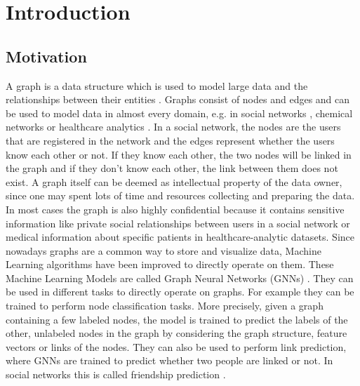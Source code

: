 \chapter{Introduction}


	\section{Motivation}

		A graph is a data structure which is used to model large data and the relationships between their entities \cite{DBLP:journals/corr/abs-2005-00687, cook2006mining}.
		Graphs consist of nodes and edges and can be used to model data in almost every domain, e.g. in social networks , chemical networks  or healthcare analytics .
		In a social network, the nodes are the users that are registered in the network and the edges represent whether the users know each other or not.
		If they know each other, the two nodes will be linked in the graph and if they don't know each other, the link between them does not exist.
		A graph itself can be deemed as intellectual property of the data owner, since one may spent lots of time and resources collecting and preparing the data.
		In most cases the graph is also highly confidential because it contains sensitive information like private social relationships between users in a social network or medical information about specific patients in healthcare-analytic datasets.
		Since nowadays graphs are a common way to store and visualize data, Machine Learning algorithms have been improved to directly operate on them.
		These Machine Learning Models are called Graph Neural Networks (GNNs) \cite{atwood2016diffusionconvolutional, defferrard2017convolutional}.
		They can be used in different tasks to directly operate on graphs.
		For example they can be trained to perform node classification tasks\cite{kipf2017semisupervised}.
		More precisely, given a graph containing a few labeled nodes, the model is trained to predict the labels of the other, unlabeled nodes in the graph by considering the graph structure, feature vectors or links of the nodes.
		They can also be used to perform link prediction, where GNNs are trained to predict whether two people are linked or not.
		In social networks this is called friendship prediction \cite{zhang2018link}.

